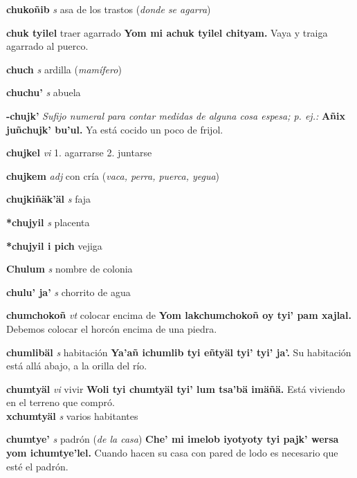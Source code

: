 \documentclass[10pt]{scrbook}
\newcommand{\entry}[1]{\textbf{#1}}
\newcommand{\onedefinition}[1]{#1.}
\newcommand{\nontranslationdef}[1]{\textit{#1}}
\newcommand{\partofspeech}[1]{\textit{#1}}
\newcommand{\spanishtranslation}[1]{#1}
\newcommand{\clarification}[1]{(\textit{#1})}
\newcommand{\cholexample}[1]{\textbf{#1}}
\newcommand{\exampletranslation}[1]{#1}
\newcommand{\secondaryentry}[1]{\\\textbf{#1}}
\newcommand{\secondpartofspeech}[1]{\textit{#1}}
\newcommand{\secondtranslation}[1]{#1}
\begin{document}
\begin{multicols}{2}
\entry{chukoñib}
\partofspeech{s}
\spanishtranslation{asa de los trastos}
\clarification{donde se agarra}

\entry{chuk tyilel}
\spanishtranslation{traer agarrado}
\cholexample{Yom mi achuk tyilel chityam.}
\exampletranslation{Vaya y traiga agarrado al puerco.}

\entry{chuch}
\partofspeech{s}
\spanishtranslation{ardilla}
\clarification{mamífero}

\entry{chuchu'}
\partofspeech{s}
\spanishtranslation{abuela}

\entry{-chujk'}
\nontranslationdef{Sufijo numeral para contar medidas de alguna cosa espesa; p. ej.:}
\cholexample{Añix juñchujk' bu'ul.}
\exampletranslation{Ya está cocido un poco de frijol.}

\entry{chujkel}
\partofspeech{vi}
\onedefinition{1}
\spanishtranslation{agarrarse}
\onedefinition{2}
\spanishtranslation{juntarse}

\entry{chujkem}
\partofspeech{adj}
\spanishtranslation{con cría}
\clarification{vaca, perra, puerca, yegua}

\entry{chujkiñäk'äl}
\partofspeech{s}
\spanishtranslation{faja}

\entry{*chujyil}
\partofspeech{s}
\spanishtranslation{placenta}

\entry{*chujyil i pich}
\spanishtranslation{vejiga}

\entry{Chulum}
\partofspeech{s}
\spanishtranslation{nombre de colonia}

\entry{chulu' ja'}
\partofspeech{s}
\spanishtranslation{chorrito de agua}

\entry{chumchokoñ}
\partofspeech{vt}
\spanishtranslation{colocar encima de}
\cholexample{Yom lakchumchokoñ oy tyi' pam xajlal.}
\exampletranslation{Debemos colocar el horcón encima de una piedra.}

\entry{chumlibäl}
\partofspeech{s}
\spanishtranslation{habitación}
\cholexample{Ya'añ ichumlib tyi eñtyäl tyi' tyi' ja'.}
\exampletranslation{Su habitación está allá abajo, a la orilla del río.}

\entry{chumtyäl}
\partofspeech{vi}
\spanishtranslation{vivir}
\cholexample{Woli tyi chumtyäl tyi' lum tsa'bä imäñä.}
\exampletranslation{Está viviendo en el terreno que compró.}
\secondaryentry{xchumtyäl}
\secondpartofspeech{s}
\secondtranslation{varios habitantes}

\entry{chumtye'}
\partofspeech{s}
\spanishtranslation{padrón}
\clarification{de la casa}
\cholexample{Che' mi imelob iyotyoty tyi pajk' wersa yom ichumtye'lel.}
\exampletranslation{Cuando hacen su casa con pared de lodo es necesario que esté el padrón.}


\end{multicols}
\end{document}
